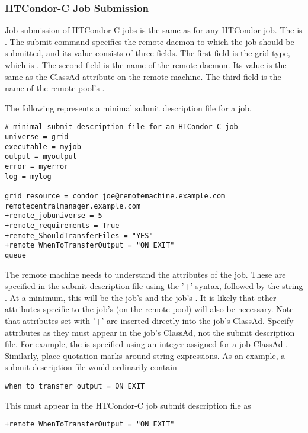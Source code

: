 \subsubsection{\label{sec:HTCondor-C-Submit}HTCondor-C Job Submission}
Job submission of HTCondor-C jobs is the same as for any HTCondor job.
The  is .
The submit command  specifies 
the remote  daemon to which
the job should be submitted, and its value consists of three fields.
The first field is the grid type, which is .
The second field is the name of the remote  daemon.
Its value is the
same as the  ClassAd attribute  on the
remote machine.
The third field is the name of the remote pool's .

The following represents a minimal submit description file for
a job.

\footnotesize
\begin{verbatim}
# minimal submit description file for an HTCondor-C job
universe = grid
executable = myjob
output = myoutput
error = myerror
log = mylog

grid_resource = condor joe@remotemachine.example.com remotecentralmanager.example.com
+remote_jobuniverse = 5
+remote_requirements = True
+remote_ShouldTransferFiles = "YES"
+remote_WhenToTransferOutput = "ON_EXIT"
queue
\end{verbatim}
\normalsize

The remote machine needs to understand the attributes of the job.
These are specified in the submit description file using the '+'
syntax, followed by the string .
At a minimum, this will be the job's  and the job's
.
It is likely that other attributes specific to the
job's  (on the remote pool) will also be necessary.
Note that attributes set with '+' are inserted directly into
the job's ClassAd.  
Specify attributes as they 
must appear in the job's ClassAd, not the submit description file. 
For example,
the  is specified using an integer assigned for
a job ClassAd .
Similarly, place quotation marks around string 
expressions.
As an example, a submit description file would ordinarily contain
\footnotesize
\begin{verbatim}
when_to_transfer_output = ON_EXIT
\end{verbatim}
\normalsize
This must appear in the HTCondor-C job submit description file as
\footnotesize
\begin{verbatim}
+remote_WhenToTransferOutput = "ON_EXIT"
\end{verbatim}
\normalsize

